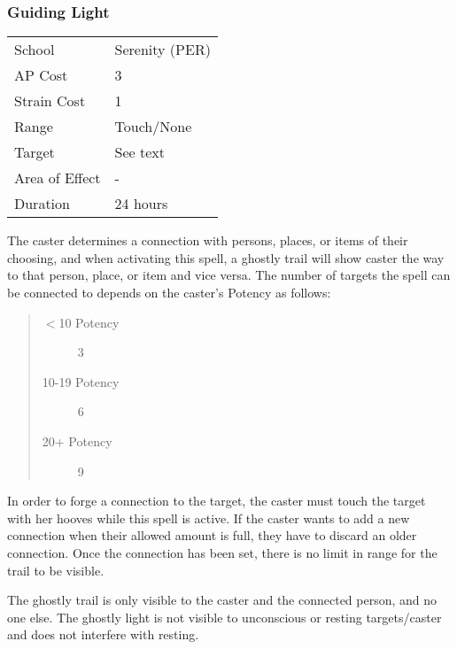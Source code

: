 \documentclass[11pt,a4paper,twocolumn]{book}
\begin{document}
\subsubsection*{Guiding Light}
{
	\begin{tabu} to 75mm{| X[l,4] | X[l,7] |}
		\hline
		School 			&  Serenity (PER)			\\
		AP Cost	      	&  3					\\
		Strain Cost     &  1					\\
		Range     		&  Touch/None			\\
		Target      	&  See text				\\
		Area of Effect  &  -	 				\\
		Duration     	&  24 hours				\\ \hline
	\end{tabu}
	
}

\medskip

The caster determines a connection with persons, places, or items of their choosing, and when activating this spell, a ghostly trail will show caster the way to that person, place, or item and vice versa. The number of targets the spell can be connected to depends on the caster's Potency as follows:

\begin{quote}
	\begin{description}
		\item[$<$10 Potency] 	3
		\item[10-19 Potency] 	6
		\item[20+ Potency]  	9
	\end{description}	
\end{quote}

In order to forge a connection to the target, the caster must touch the target with her hooves while this spell is active. If the caster wants to add a new connection when their allowed amount is full, they have to discard an older connection. Once the connection has been set, there is no limit in range for the trail to be visible.

The ghostly trail is only visible to the caster and the connected person, and no one else. The ghostly light is not visible to unconscious or resting targets/caster and does not interfere with resting.
\end{document}
